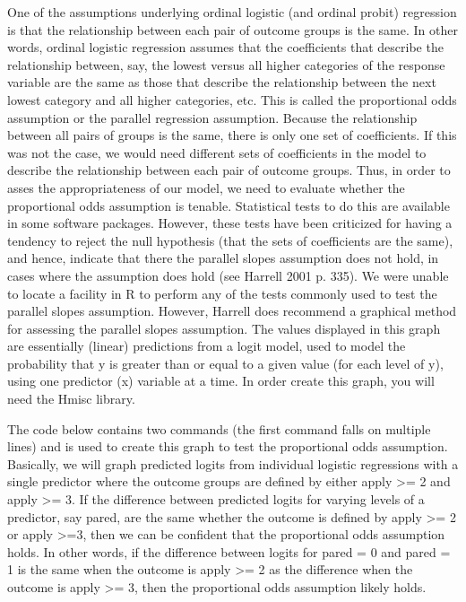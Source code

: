 \documentclass[00-GLMregression.tex]{subfiles}
\begin{document}
One of the assumptions underlying ordinal logistic (and ordinal probit) regression is that the relationship between each pair of outcome groups is the same. In other words, ordinal logistic regression assumes that the coefficients that describe the relationship between, say, the lowest versus all higher categories of the response variable are the same as those that describe the relationship between the next lowest category and all higher categories, etc. This is called the proportional odds assumption or the parallel regression assumption. Because the relationship between all pairs of groups is the same, there is only one set of coefficients. If this was not the case, we would need different sets of coefficients in the model to describe the relationship between each pair of outcome groups. Thus, in order to asses the appropriateness of our model, we need to evaluate whether the proportional odds assumption is tenable. Statistical tests to do this are available in some software packages. However, these tests have been criticized for having a tendency to reject the null hypothesis (that the sets of coefficients are the same), and hence, indicate that there the parallel slopes assumption does not hold, in cases where the assumption does hold (see Harrell 2001 p. 335). We were unable to locate a facility in R to perform any of the tests commonly used to test the parallel slopes assumption. However, Harrell does recommend a graphical method for assessing the parallel slopes assumption. The values displayed in this graph are essentially (linear) predictions from a logit model, used to model the probability that y is greater than or equal to a given value (for each level of y), using one predictor (x) variable at a time. In order create this graph, you will need the Hmisc library.

The code below contains two commands (the first command falls on multiple lines) and is used to create this graph to test the proportional odds assumption. Basically, we will graph predicted logits from individual logistic regressions with a single predictor where the outcome groups are defined by either apply >= 2 and apply >= 3. If the difference between predicted logits for varying levels of a predictor, say pared, are the same whether the outcome is defined by apply >= 2 or apply >=3, then we can be confident that the proportional odds assumption holds. In other words, if the difference between logits for pared = 0 and pared = 1 is the same when the outcome is apply >= 2 as the difference when the outcome is apply >= 3, then the proportional odds assumption likely holds.
\end{document}

